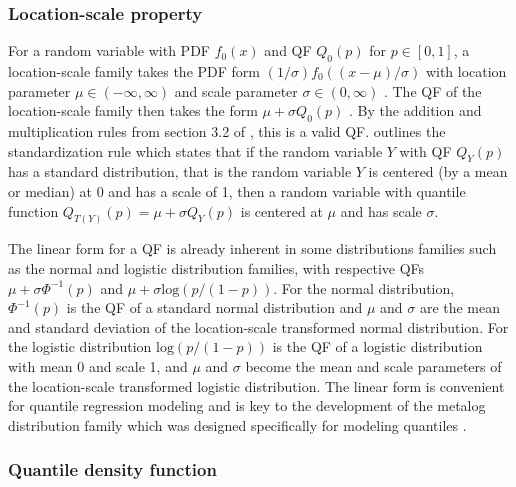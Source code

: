 \subsubsection{Location-scale property}
For a random variable with PDF $f_0\left(x\right)$ and 
QF $Q_0\left(p\right)$ for $p \in \left[0,1\right]$, a 
location-scale family takes the PDF form 
$\left(1/\sigma\right)f_0\left(\left(x - \mu\right)/\sigma\right)$ 
with location parameter 
$\mu \in \left( -\infty, \infty \right)$ and scale parameter 
$\sigma \in \left(0, \infty \right)$ \cite[]{casella2002statistical}. 
The QF of the 
location-scale family then takes the form $\mu + \sigma Q_0\left(p \right)$ 
\cite[]{parzen2004quantile}. By the addition and multiplication rules from 
section 3.2 of \cite{gilchrist2000statistical}, 
this is a valid QF. \cite{gilchrist2000statistical} outlines the 
standardization rule which states that if the random variable $Y$ with QF 
$Q_Y\left(p \right)$ has a standard distribution, that is the 
random variable $Y$ is 
centered (by a mean or median) at 0 and has a scale of 1, then a random 
variable with quantile function 
$Q_{T\left(Y \right)}\left(p \right) = \mu + \sigma Q_Y\left(p \right)$ is 
centered at $\mu$ and has scale $\sigma$.

The linear form for a QF is already inherent in some distributions families 
such as the normal and logistic distribution families, with respective QFs 
$\mu + \sigma \Phi^{-1} \left(p \right)$ and 
$\mu + \sigma \text{log}\left(p/ \left(1 - p \right) \right)$. For the
normal distribution, 
$\Phi^{-1}\left(p \right)$ is the QF of a standard normal distribution 
and $\mu$ and $\sigma$ are the mean and standard deviation of the 
location-scale transformed normal distribution. For the logistic distribution 
$\text{log}\left(p/\left(1-p \right) \right)$ 
is the QF of a logistic distribution with mean 0 and 
scale 1, and $\mu$ and $\sigma$ become the mean and scale parameters of the 
location-scale transformed logistic distribution. The linear form is convenient 
for quantile regression modeling and is key to the development of the metalog 
distribution family which was designed specifically for modeling quantiles 
\cite[]{keelin2016metalog}. 

\subsubsection{Quantile density function}

